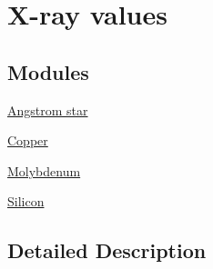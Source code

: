 \hypertarget{group___n_i_s_t_const-_x-ray}{}\section{X-\/ray values}
\label{group___n_i_s_t_const-_x-ray}
\subsection*{Modules}
\begin{DoxyCompactItemize}
\item 
\hyperlink{group___n_i_s_t_const-_angstrom_star}{Angstrom star}
\item 
\hyperlink{group___n_i_s_t_const-_copper}{Copper}
\item 
\hyperlink{group___n_i_s_t_const-_molybdenum}{Molybdenum}
\item 
\hyperlink{group___n_i_s_t_const-_silicon}{Silicon}
\end{DoxyCompactItemize}


\subsection{Detailed Description}
